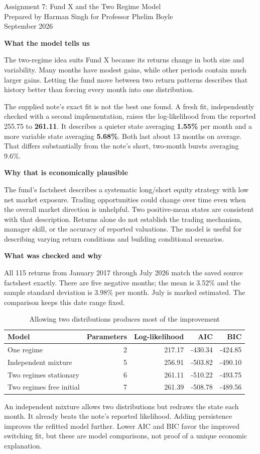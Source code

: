 \documentclass[11pt]{article}
\newcommand{\smalltitle}[1]{\vspace{5pt}\textbf{#1}\par}
\begin{document}
\begin{center}
{\Large Assignment 7: Fund X and the Two Regime Model}\\[5pt]
Prepared by Harman Singh for Professor Phelim Boyle\\
September 2026
\end{center}

\smalltitle{What the model tells us}
The two-regime idea suits Fund X because its returns change in both size and
variability. Many months have modest gains, while other periods contain much
larger gains. Letting the fund move between two return patterns describes that
history better than forcing every month into one distribution.

The supplied note's exact fit is not the best one found. A fresh fit, independently
checked with a second implementation, raises the log-likelihood from the reported
255.75 to \textbf{261.11}. It describes a quieter state averaging \textbf{1.55\%}
per month and a more variable state averaging \textbf{5.68\%}. Both last about
13 months on average. That differs substantially from the note's short, two-month
bursts averaging 9.6\%.

\smalltitle{Why that is economically plausible}
The fund's factsheet describes a systematic long/short equity strategy with low
net market exposure. Trading opportunities could change over time even when the
overall market direction is unhelpful. Two positive-mean states are consistent
with that description. Returns alone do not establish the trading mechanism,
manager skill, or the accuracy of reported valuations. The model is useful for
describing varying return conditions and building conditional scenarios.

\smalltitle{What was checked and why}
All 115 returns from January 2017 through July 2026 match the saved source
factsheet exactly. There are five negative months; the mean is 3.52\% and the
sample standard deviation is 3.98\% per month. July is marked estimated.
The comparison keeps this date range fixed.

\begin{table}[H]\centering\small
\caption{Allowing two distributions produces most of the improvement}
\begin{tabular}{lrrrr}\toprule
Model & Parameters & Log-likelihood & AIC & BIC\\\midrule
One regime & 2 & 217.17 & -430.34 & -424.85 \\
Independent mixture & 5 & 256.91 & -503.82 & -490.10 \\
Two regimes stationary & 6 & 261.11 & -510.22 & -493.75 \\
Two regimes free initial & 7 & 261.39 & -508.78 & -489.56 \\
\bottomrule\end{tabular}
\end{table}
An independent mixture allows two distributions but redraws the state each month.
It already beats the note's reported likelihood. Adding persistence improves
the refitted model further. Lower AIC and BIC favor the improved switching fit,
but these are model comparisons, not proof of a unique economic explanation.
\end{document}
